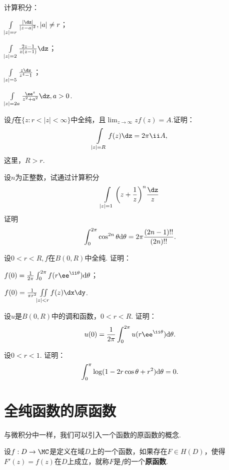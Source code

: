 \begin{xiti}
\item 计算积分：
\begin{enuma}
  \item $\int\limits_{|z|=r}\frac{|\dz|}{|z-a|^2},|a|\ne r$；
  \item $\int\limits_{|z|=2}\frac{2z-1}{z(z-1)}\dz$；
  \item $\int\limits_{|z|=5}\frac{z\dz}{z^4-1}$；
  \item $\int\limits_{|z|=2a}\frac{\ee^z}{z^2+a^2}\dz,a>0$.
\end{enuma}
\item 设$f$在$\{z:r<|z|<\infty\}$中全纯，且$\lim_{z\to\infty}zf(z)=A$.证明：
\[\int\limits_{|z|=R}f(z)\dz=2\pi\ii A,\]
这里，$R>r$.
\item 设$n$为正整数，试通过计算积分
\[\int\limits_{|z|=1}\bigg(z+\frac1z\bigg)^n\frac{\dz}z\]
证明
\[\int_0^{2\pi}\cos^{2n}\theta\textrm d\theta=2\pi\frac{(2n-1)!!}{(2n)!!}.\]
\item 设$0<r<R,f$在$B(0,R)$中全纯. 证明：
\begin{enuma}
  \item $f(0)=\frac1{2\pi}\int_0^{2\pi}f(r\ee^{\ii\theta})\textrm d\theta$；
  \item $f(0)=\frac1{\pi r^2}\iint\limits_{|z|<r}f(z)\dx\dy$.
\end{enuma}
\item 设$u$是$B(0,R)$中的调和函数，$0<r<R$. 证明：
\[u(0)=\frac1{2\pi}\int_0^{2\pi}u(r\ee^{\ii\theta})\textrm d\theta.\]
\item 设$0<r<1$. 证明：
\[\int_0^\pi\log(1-2r\cos\theta+r^2)\textrm d\theta=0.\]
\end{xiti}

\section{全纯函数的原函数\label{sec3.3}}
与微积分中一样，我们可以引入一个函数的原函数的概念.
\begin{definition}\label{def3.3.1}
设$f:D\to\MC$是定义在域$D$上的一个函数，如果存在$F\in H(D)$，使得$F'(z)=f(z)$在$D$上成立，就称$F$是$f$的一个\textbf{原函数}.
\end{definition}

